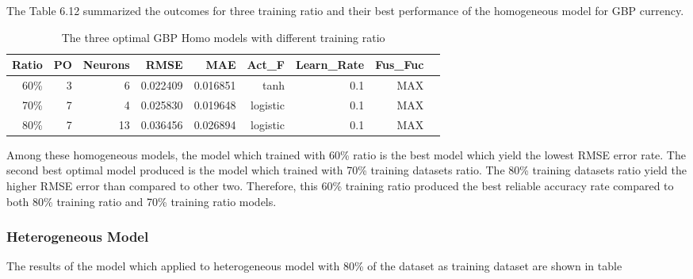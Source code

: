 {{{{{{{{{{{{{{{{{{{			
			The Table 6.12 summarized the outcomes for three training ratio and their best performance of the homogeneous model for GBP currency.
			
			\setlength{\tabcolsep}{0.5em} %
			{\renewcommand{\arraystretch}{1.2}
				
				\begin{table}[ht]
					\centering
					\begin{tabular}{@{}rrrrrrrrr@{}}
						\toprule
						\textbf{Ratio}&\textbf{PO}&\textbf{Neurons}& \textbf{RMSE} & \textbf{MAE} & \textbf{Act\_F} & \textbf{Learn\_Rate} &\textbf{ Fus\_Fuc}\\ 
						\midrule
						60\% & 3 & 6 & 0.022409 & 0.016851 & tanh & 0.1 & MAX \\
						70\% & 7 & 4 & 0.025830 & 0.019648 & logistic & 0.1 & MAX \\
						80\% & 7 & 13 & 0.036456 & 0.026894 & logistic & 0.1 & MAX \\
						\hline
					\end{tabular}
					\hspace*{1cm}
					\caption{The three optimal GBP Homo models with different training ratio}
					
				\end{table}
				
Among these homogeneous models, the model which trained with 60\% ratio is the best model which yield the lowest RMSE error rate. The second best optimal model produced is the model which trained with 70\% training datasets ratio. The 80\% training datasets ratio yield the higher RMSE error than compared to other two. Therefore, this 60\% training ratio produced the best reliable accuracy rate compared to both  80\% training ratio  and 70\% training ratio models.

\subsubsection{Heterogeneous Model}

The results of the model which applied to heterogeneous model with 80\% of the dataset as training dataset are shown in table

\setlength{\tabcolsep}{0.5em} %
{\renewcommand{\arraystretch}{1.2}
	\begin{table}[ht]
		

\end{table}}}}}}}}}}}}}}}}}}}}}}
